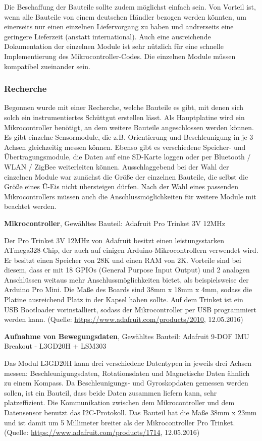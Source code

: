 Die Beschaffung der Bauteile sollte zudem möglichst einfach sein. Von Vorteil ist, wenn alle Bauteile von einem deutschen Händler bezogen werden könnten, um einerseits nur einen einzelnen Liefervorgang zu haben und andrerseits eine geringere Lieferzeit (anstatt international). Auch eine ausreichende Dokumentation der einzelnen Module ist sehr nützlich für eine schnelle Implementierung des Mikrocontroller-Codes. Die einzelnen Module müssen kompatibel zueinander sein.

\subsubsection{Recherche}
Begonnen wurde mit einer Recherche, welche Bauteile es gibt, mit denen sich solch ein instrumentiertes Schüttgut erstellen lässt. Als Hauptplatine wird ein Mikrocontroller benötigt, an dem weitere Bauteile angeschlossen werden können. Es gibt einzelne Sensormodule, die z.B. Orientierung und Beschleunigung in je 3 Achsen gleichzeitig messen können. Ebenso gibt es verschiedene Speicher- und Übertragungsmodule, die Daten auf eine SD-Karte loggen oder per Bluetooth / WLAN / ZigBee weiterleiten können. Ausschlaggebend bei der Wahl der einzelnen Module war zunächst die Größe der einzelnen Bauteile, die selbst die Größe eines Ü-Eis nicht übersteigen dürfen. Nach der Wahl eines passenden Mikrocontrollers müssen auch die Anschlussmöglichkeiten für weitere Module mit beachtet werden.

\textbf{Mikrocontroller}, Gewähltes Bauteil: Adafruit Pro Trinket 3V 12MHz

Der Pro Trinket 3V 12MHz von Adafruit besitzt einen leistungsstarken ATmega328-Chip, der auch auf einigen Arduino-Mikrocontrollern verwendet wird. Er besitzt einen Speicher von 28K und einen RAM von 2K. Vorteile sind bei diesem, dass er mit 18 GPIOs (General Purpose Input Output) und 2 analogen Anschlüssen weitaus mehr Anschlussmöglichkeiten bietet, als beispielsweise der Arduino Pro Mini. Die Maße des Boards sind  38mm x 18mm x 4mm, sodass die Platine ausreichend Platz in der Kapsel haben sollte. Auf dem Trinket ist ein USB Bootloader vorinstalliert, sodass der Mikrocontroller per USB programmiert werden kann. (Quelle: \url{https://www.adafruit.com/products/2010}, 12.05.2016)

\textbf{Aufnahme von Bewegungsdaten}, Gewähltes Bauteil: Adafruit 9-DOF IMU Breakout - L3GD20H + LSM303

Das Modul L3GD20H kann drei verschiedene Datentypen in jeweils drei Achsen messen: Beschleunigungsdaten, Rotationsdaten und Magnetische Daten ähnlich zu einem Kompass. Da Beschleunigungs- und Gyroskopdaten gemessen werden sollen, ist ein Bauteil, dass beide Daten zusammen liefern kann, sehr platzeffizient. Die Kommunikation zwischen dem Mikrocontroller und dem Datensensor benutzt das I2C-Protokoll. Das Bauteil hat die Maße 38mm x 23mm und ist damit um 5 Millimeter breiter als der Mikrocontroller Pro Trinket. (Quelle: \url{https://www.adafruit.com/products/1714}, 12.05.2016)

